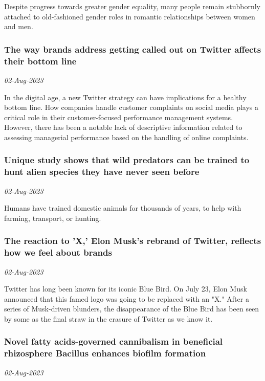 Despite progress towards greater gender equality, many people remain stubbornly attached to old-fashioned gender roles in romantic relationships between women and men.
\subsubsection{The way brands address getting called out on Twitter affects their bottom line \href{https://phys.org/news/2023-08-brands-twitter-affects-bottom-line.html}{}}
\textit{02-Aug-2023}

In the digital age, a new Twitter strategy can have implications for a healthy bottom line. How companies handle customer complaints on social media plays a critical role in their customer-focused performance management systems. However, there has been a notable lack of descriptive information related to assessing managerial performance based on the handling of online complaints.
\subsubsection{Unique study shows that wild predators can be trained to hunt alien species they have never seen before \href{https://phys.org/news/2023-08-unique-wild-predators-alien-species.html}{}}
\textit{02-Aug-2023}

Humans have trained domestic animals for thousands of years, to help with farming, transport, or hunting.
\subsubsection{The reaction to 'X,' Elon Musk's rebrand of Twitter, reflects how we feel about brands \href{https://phys.org/news/2023-08-reaction-elon-musk-rebrand-twitter.html}{}}
\textit{02-Aug-2023}

Twitter has long been known for its iconic Blue Bird. On July 23, Elon Musk announced that this famed logo was going to be replaced with an "X." After a series of Musk-driven blunders, the disappearance of the Blue Bird has been seen by some as the final straw in the erasure of Twitter as we know it.
\subsubsection{Novel fatty acids-governed cannibalism in beneficial rhizosphere Bacillus enhances biofilm formation \href{https://phys.org/news/2023-08-fatty-acids-governed-cannibalism-beneficial-rhizosphere.html}{}}
\textit{02-Aug-2023}

